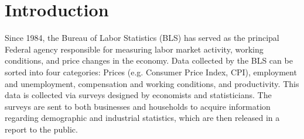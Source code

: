 \documentclass{sigchi}
\newcommand\Peter[1]{{\color{red}#1}}	%
\begin{document}


\section{Introduction}

\Peter{Since 1984, the Bureau of Labor Statistics (BLS) has served as the principal Federal agency responsible for measuring labor market activity, working conditions, and price changes in the economy. Data collected by the BLS can be sorted into four categories: Prices (e.g. Consumer Price Index, CPI), employment and unemployment, compensation and working conditions, and productivity. This data is collected via surveys designed by economists and statisticians. The surveys are sent to both businesses and households to acquire information regarding demographic and industrial statistics, which are then released in a report to the public.}
\end{document}
